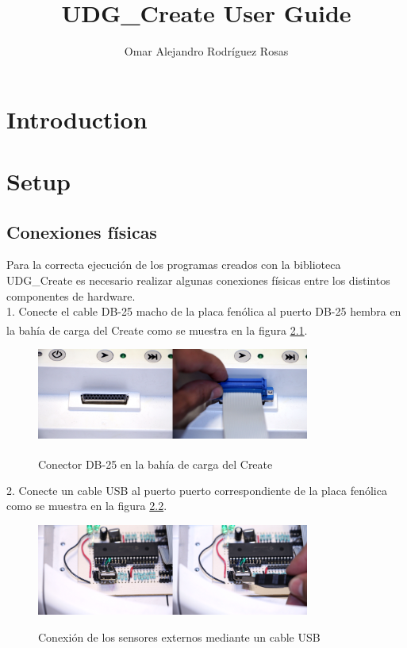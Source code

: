 \documentclass[letterpaper]{book}
\title{UDG\_Create User Guide}
\author{Omar Alejandro Rodr\'{i}guez Rosas}
\begin{document}
\maketitle

\tableofcontents
\chapter{Introduction}


 

\chapter{Setup}

\section{Conexiones físicas}
Para la correcta ejecución de los programas creados con la biblioteca UDG\_Create es necesario realizar algunas conexiones físicas entre los distintos componentes de hardware.\\
1. Conecte el cable DB-25 macho de la placa fenólica al puerto DB-25 hembra en la bahía de carga del Create\textsuperscript{\textregistered} como se muestra en la figura \ref{fig:cargoCable}.\\
\begin{figure}
\begin{center}
\includegraphics[width=0.8\textwidth]{figures/cargo.jpg}
\caption{Conector DB-25 en la bahía de carga del Create\textsuperscript{\textregistered}}
\centering
\label{fig:cargoCable}
\end{center}
\end{figure} 
2. Conecte un cable USB al puerto puerto correspondiente de la placa fenólica como se muestra en la figura \ref{fig:usbCable}.\\
\begin{figure}
\begin{center}
\includegraphics[width=0.8\textwidth]{figures/usbcable.jpg}
\caption{Conexión de los sensores externos mediante un cable USB}
\centering
\label{fig:usbCable}
\end{center}
\end{figure} 
\end{document}
